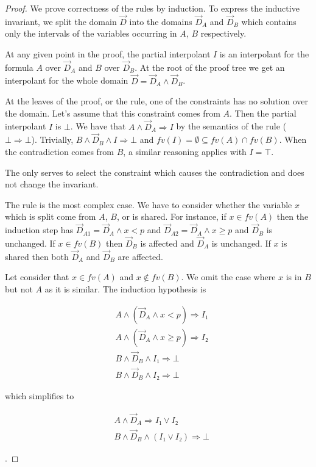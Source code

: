 \begin{proof}
We prove correctness of the rules by induction.
To express the inductive invariant, we split the domain $\vec D$ into the domains $\vec D_A$ and $\vec D_B$ which contains only the intervals of the variables occurring in $A$, $B$ respectively.

At any given point in the proof, the partial interpolant $I$ is an interpolant for the formula $A$ over $\vec D_A$ and $B$ over $\vec D_B$.
At the root of the proof tree we get an interpolant for the whole domain $\vec D = \vec D_A ∧ \vec D_B$.

At the leaves of the proof, or the \thLemI rule, one of the constraints has no solution over the domain.
Let's assume that this constraint comes from $A$.
Then the partial interpolant $I$ is $⊥$.
We have that $A ∧ \vec D_A ⇒ I$ by the semantics of the \thLem rule ($⊥⇒⊥$).
Trivially, $B ∧ \vec D_B ∧ I ⇒ ⊥$ and $fv(I) = ∅ ⊆ fv(A) ∩ fv(B)$.
When the contradiction comes from $B$, a similar reasoning applies with $I=⊤$.

The \weakenI only serves to select the constraint which causes the contradiction and does not change the invariant.

The \spltI rule is the most complex case.
We have to consider whether the variable $x$ which is split come from $A$, $B$, or is shared.
For instance, if $x∈ fv(A)$ then the induction step has $\vec D_{A1} = \vec D_A ∧ x < p$ and $\vec D_{A2} = \vec D_A ∧ x ≥ p$ and $\vec D_B$ is unchanged.
If $x ∈ fv(B)$ then $\vec D_B$ is affected and $\vec D_A$ is unchanged.
If $x$ is shared then both $\vec D_A$ and $\vec D_B$ are affected.

Let consider that $x ∈ fv(A)$ and $x ∉ fv(B)$.
We omit the case where $x$ is in $B$ but not $A$ as it is similar.
The induction hypothesis is\\
\parbox{0.35\linewidth}{
\begin{eqnarray*}
& A ∧ (\vec D_A ∧ x < p) ⇒ I₁ \\
& A ∧ (\vec D_A ∧ x ≥ p) ⇒ I₂ \\
& B ∧ \vec D_B ∧ I₁ ⇒ ⊥ \\
& B ∧ \vec D_B ∧ I₂ ⇒ ⊥
\end{eqnarray*}
}
which simplifies to
\parbox{0.35\linewidth}{
\begin{eqnarray*}
& A ∧ \vec D_A ⇒ I₁ ∨ I₂ \\
& B ∧ \vec D_B ∧ (I₁ ∨ I₂) ⇒ ⊥
\end{eqnarray*}
}.


\end{proof}

